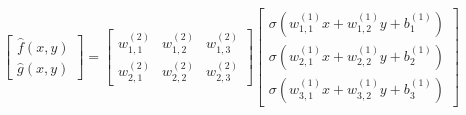 \documentclass[preview]{standalone}
\begin{document}
\begin{align*}
\begin{bmatrix} \hat{f}(x,y) \\ \hat{g}(x,y) \end{bmatrix} = \begin{bmatrix} w_{1,1}^{(2)} & w_{1,2}^{(2)} & w_{1,3}^{(2)} \\ w_{2,1}^{(2)} & w_{2,2}^{(2)} & w_{2,3}^{(2)} \end{bmatrix} \begin{bmatrix} \sigma(w_{1,1}^{(1)}x + w_{1,2}^{(1)}y +b_1^{(1)}) \\ \sigma(w_{2,1}^{(1)}x + w_{2,2}^{(1)}y +b_2^{(1)}) \\ \sigma(w_{3,1}^{(1)}x + w_{3,2}^{(1)}y +b_3^{(1)}) \end{bmatrix}
\end{align*}
\end{document}
